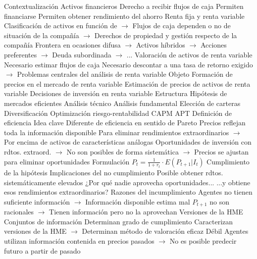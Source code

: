 \documentclass{nuevotema}
\begin{document}
\begin{esquemal}
	\1[] 
		\2 Contextualización
			\3 Activos financieros
				\4 Derecho a recibir flujos de caja
				\4 Permiten financiarse
				\4 Permiten obtener rendimiento del ahorro
			\3 Renta fija y renta variable
				\4 Clasificación de activos en función de
				\4[] $\to$ Flujos de caja dependen o no de situación de la compañía
				\4[] $\to$ Derechos de propiedad y gestión respecto de la compañía
				\4 Frontera en ocasiones difusa
				\4[] $\to$ Activos híbridos
				\4[] $\to$ Acciones preferentes
				\4[] $\to$ Deuda subordinada
				\4[] $\to$ ...
			\3 Valoración de activos de renta variable
				\4 Necesario estimar flujos de caja
				\4 Necesario descontar a una tasa de retorno exigido
				\4[] $\to$ Problemas centrales del análisis de renta variable
		\2 Objeto
			\3 Formación de precios en el mercado de renta variable
			\3 Estimación de precios de activos de renta variable
			\3 Decisiones de inversión en renta variable
		\2 Estructura
			\3 Hipótesis de mercados eficientes
			\3 Análisis técnico
			\3 Análisis fundamental
			\3 Elección de carteras
				\4 Diversificación
				\4 Optimización riesgo-rentabilidad
			\3 CAPM
			\3 APT
	\1 
		\2 Definición de eficiencia
			\3 Idea clave
				\4 Diferente de eficiencia en sentido de Pareto
				\4 Precios reflejan toda la información disponible
				\4[] Para eliminar rendimientos extraordinarios
				\4[] $\to$ Por encima de activos de características análogas
				\4 Oportunidades de inversión con rdtos. extraord.
				\4[] $\to$ No son posibles de forma sistemática
				\4[] $\to$ Precios se ajustan para eliminar oportunidades
			\3 Formulación
				\4 $P_t = \frac{1}{1 + r_t} \cdot E \left( P_{t+1} | I_t \right)$
		\2 Cumplimiento de la hipótesis
			\3 Implicaciones del no cumplimiento
				\4 Posible obtener rdtos. sistemáticamente elevados
				\4 ¿Por qué nadie aprovecha oportunidades...
				\4[] ...y obtiene esos rendimientos extraordinarios?
			\3 Razones del incumplimiento
				\4 Agentes
				\4[] no tienen suficiente información
				\4[] $\to$ Información disponible estima mal $P_{t+1}$
				\4[] no son racionales
				\4[] $\to$ Tienen información pero no la aprovechan
		\2 Versiones de la HME
			\3 Conjuntos de información
				\4 Determinan grado de cumplimiento
				\4 Caracterizan versiones de la HME
				\4[] $\to$ Determinan método de valoración eficaz
			\3 Débil
				\4 Agentes utilizan información contenida en precios pasados
				\4[] $\to$ No es posible predecir futuro a partir de pasado

\end{esquemal}
\end{document}
